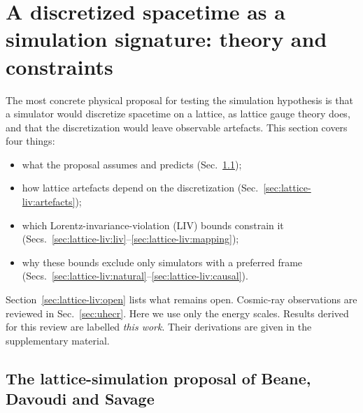 \section{A discretized spacetime as a simulation signature: theory and constraints}
\label{sec:lattice-liv}

The most concrete physical proposal for testing the simulation hypothesis is that a simulator would discretize spacetime on a lattice, as lattice gauge theory does, and that the discretization would leave observable artefacts. This section covers four things:
\begin{itemize}
\item what the proposal assumes and predicts (Sec.~\ref{sec:lattice-liv:beane});
\item how lattice artefacts depend on the discretization (Sec.~\ref{sec:lattice-liv:artefacts});
\item which Lorentz-invariance-violation (LIV) bounds constrain it (Secs.~\ref{sec:lattice-liv:liv}--\ref{sec:lattice-liv:mapping});
\item why these bounds exclude only simulators with a preferred frame (Secs.~\ref{sec:lattice-liv:natural}--\ref{sec:lattice-liv:causal}).
\end{itemize}
Section~\ref{sec:lattice-liv:open} lists what remains open. Cosmic-ray observations are reviewed in Sec.~\ref{sec:uhecr}. Here we use only the energy scales. Results derived for this review are labelled \emph{this work}. Their derivations are given in the supplementary material.

\subsection{The lattice-simulation proposal of Beane, Davoudi and Savage}
\label{sec:lattice-liv:beane}

